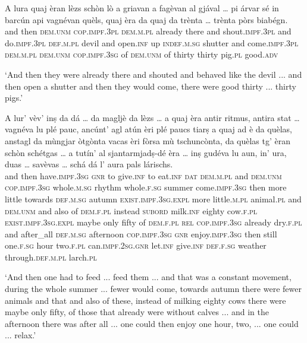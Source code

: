 \begin{linenumbers}
	\gll  A lura quaj èran lèzs schòn lò a griavan a fagèvan al gjával … pi\footnotemark{} árvar sé in barcún api vagnévan quèls, quaj èra da quaj da trènta … trènta pòrs biabégn.  \\
	and then \textsc{dem.unm} \textsc{cop.impf.3pl} \textsc{dem.m.pl} already there and shout.\textsc{impf.3pl} and do.\textsc{impf.3pl} \textsc{def.m.pl} devil {} and open.\textsc{inf} up \textsc{indef.m.sg} shutter and come.\textsc{impf.3pl} \textsc{dem.m.pl}  \textsc{dem.unm} \textsc{cop.impf.3sg} of \textsc{dem.unm} of thirty {} thirty pig.\textsc{pl} good.\textsc{adv}\\
\end{linenumbers}
\medskip
\glt `And then they were already there and shouted and behaved like the devil ... and then open a shutter and then they would come, there were good thirty ... thirty pigs.'
\medskip

\begin{linenumbers}
	\gll A lur' vèv’ inṣ da dá … da magljè da lèzs … a quaj èra antir ritmus, antira stat … vagnéva lu plé pauc,  ancúnt’ agl atún èri plé paucs tiarṣ a quaj ad è da quèlas, anstagl da mùngjar òtgònta vacas èri fòrsa mù tschuncònta, da quèlas tg’ èran schòn schétgas … a tutín’ al sjantarmjadṣ-dé èra … inṣ gudéva lu aun, in’ ura, duas … savèvas … schá dá l’ aura pals lárischs.\\
	and then have.\textsc{impf.3sg} \textsc{gnr} to give.\textsc{inf} {} to eat.\textsc{inf} \textsc{dat} \textsc{dem.m.pl} {} and \textsc{dem.unm} \textsc{cop.impf.3sg} whole.\textsc{m.sg} rhythm whole.\textsc{f.sg} summer {} come.\textsc{impf.3sg} then more little towards \textsc{def.m.sg} autumn \textsc{exist.impf.3sg.expl} more little.\textsc{m.pl} animal.\textsc{pl} and \textsc{dem.unm} and also of \textsc{dem.f.pl} instead \textsc{subord} milk.\textsc{inf} eighty cow.\textsc{f.pl} \textsc{exist.impf.3sg.expl} maybe only fifty of \textsc{dem.f.pl} \textsc{rel} \textsc{cop.impf.3sg} already dry.\textsc{f.pl} {} and after\_all \textsc{def.m.sg} afternoon \textsc{cop.impf.3sg} {} \textsc{gnr} enjoy.\textsc{impf.3sg} then still one.\textsc{f.sg} hour two.\textsc{f.pl} {} can.\textsc{impf.2sg.gnr} {} let.\textsc{inf} give.\textsc{inf} \textsc{def.f.sg} weather through.\textsc{def.m.pl} larch.\textsc{pl}\\
\end{linenumbers}
\medskip
\glt `And then one had to feed ... feed them ... and that was a constant movement, during the whole summer ... fewer would come, towards autumn there were fewer animals and that and also of these, instead of milking eighty cows there were maybe only fifty, of those that already were without calves ... and in the afternoon there was after all ... one could then enjoy one hour, two, ... one could ... relax.'
\medskip

